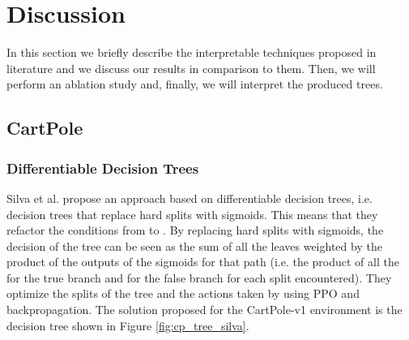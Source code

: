 \documentclass[review,english]{elsarticle}
\begin{document}
\newpage
\section{Discussion}
\label{sec:discussion}

In this section we briefly describe the interpretable techniques proposed in literature and we discuss our results in comparison to them.
Then, we will perform an ablation study and, finally, we will interpret the produced trees.

\subsection{CartPole}
\subsubsection{Differentiable Decision Trees}
Silva et al. \cite{silva_optimization_2020} propose an approach based on differentiable decision trees, i.e. decision trees that replace hard splits with sigmoids.
This means that they refactor the conditions from  to .
By replacing hard splits with sigmoids, the decision of the tree can be seen as the sum of all the leaves weighted by the product of the outputs of the sigmoids for that path (i.e. the product of all the  for the true branch and  for the false branch for each split encountered).
They optimize the splits of the tree and the actions taken by using PPO \cite{schulman_proximal_2017} and backpropagation.
The solution proposed for the CartPole-v1 environment is the decision tree shown in Figure \ref{fig:cp_tree_silva}.
\end{document}
